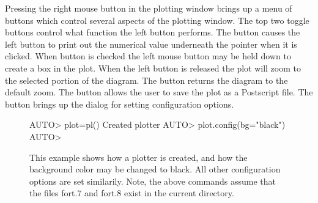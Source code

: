 Pressing the right mouse button in the plotting window brings
up a menu of buttons which control several aspects
of the plotting window.  The top two toggle buttons
control what function the left button performs.  
The  button causes the
left button to print out the numerical value underneath
the pointer when it is clicked.
When  button is checked the left
mouse button may be held down to create
a box in the plot.  When the left button
is released the plot will zoom to the selected
portion of the diagram.
The  button returns the
diagram to the default zoom. 
The  button allows the user
to save the plot as a Postscript file.
The  button brings up
the dialog for setting configuration options.

\begin{figure}[htbp]
{\small \begin{center} \begin{boxedverbatim} 
AUTO> plot=pl()
Created plotter
AUTO> plot.config(bg="black")
AUTO> 
\end{boxedverbatim}
\end{center} 
}
\caption[Configuring a two-dimensional plotter.]
{This example shows how a plotter is created, and
how the background color may be changed to black.
All other configuration options are set similarily.
Note, the above commands assume that the files
fort.7 and fort.8 exist in the current directory.
}
\label{exa:plotter_example}
\end{figure}

